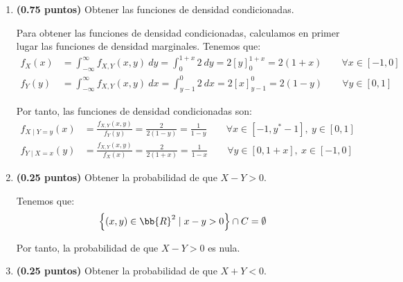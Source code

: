 \documentclass[12pt]{article}
\begin{document}
\begin{ejercicio}[5 puntos]
\begin{enumerate}
            
            \item \textbf{(0.75 puntos)} Obtener las funciones de densidad condicionadas.
            
            Para obtener las funciones de densidad condicionadas, calculamos en primer lugar las funciones de densidad marginales. Tenemos que:
            \begin{align*}
                f_X(x) &= \int_{-\infty}^{\infty} f_{X,Y}(x,y) \ dy
                = \int_{0}^{1+x} 2 \ dy = 2\left[y\right]_{0}^{1+x} = 2(1+x) \qquad \forall x\in \left[-1,0\right] \\
                f_Y(y) &= \int_{-\infty}^{\infty} f_{X,Y}(x,y) \ dx
                = \int_{y-1}^{0} 2 \ dx = 2\left[x\right]_{y-1}^{0} = 2(1-y) \qquad \forall y\in \left[0,1\right]
            \end{align*}

            Por tanto, las funciones de densidad condicionadas son:
            \begin{align*}
                f_{X\mid Y=y}(x) &= \frac{f_{X,Y}(x,y)}{f_Y(y)} = \frac{2}{2(1-y)} = \frac{1}{1-y} \qquad \forall x\in \left[-1,y^*-1\right], \ y\in \left[0,1\right] \\
                f_{Y\mid X=x}(y) &= \frac{f_{X,Y}(x,y)}{f_X(x)} = \frac{2}{2(1+x)} = \frac{1}{1-x} \qquad \forall y\in \left[0,1+x\right], \ x\in \left[-1,0\right]
            \end{align*}
            \item \textbf{(0.25 puntos)} Obtener la probabilidad de que $X-Y > 0$.
            
            Tenemos que:
            \begin{equation*}
                \left\{(x,y)\in \bb{R}^2 \mid x-y>0\right\}\cap C=\emptyset
            \end{equation*}

            Por tanto, la probabilidad de que $X-Y>0$ es nula.
            \item \textbf{(0.25 puntos)} Obtener la probabilidad de que $X+Y < 0$.
            

\end{enumerate}
\end{ejercicio}
\end{document}
